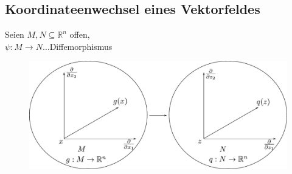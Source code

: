 \documentclass[ngerman]{tudscrreprt}
\begin{document}
\subsection{Koordinateenwechsel eines Vektorfeldes }
Seien $M, N \subseteq \mathbb{R}^n$ offen, \\ 
$\psi: M \to N\dots $Diffemorphismus 
\begin{figure}[H]
\centering
\def\svgwidth{200pt} 
  \includegraphics[width=12.5cm]{images/im3_12.pdf}
\end{figure}
\end{document}
